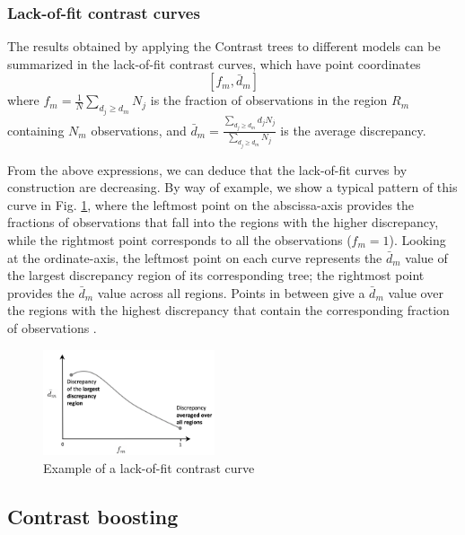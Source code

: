 \documentclass[fleqn,10pt]{wlscirep}
\begin{document}
\subsubsection*{Lack-of-fit contrast curves}

The results obtained by applying the Contrast trees to different models can be summarized in the lack-of-fit contrast curves, which have point coordinates 
$$[f_m,\bar{d}_m]$$
where $f_m=\frac{1}{N}\sum_{d_j\geq d_m}N_j$ is the fraction of observations in the region $R_m$ containing $N_m$ observations, and $\bar{d}_m=\frac{\sum_{d_j\geq d_m}d_j N_j}{\sum_{d_j\geq d_m}N_j}$ is the average discrepancy.

From the above expressions, we can deduce that the lack-of-fit curves by construction are decreasing. By way of example, we show a typical pattern of this curve in Fig. \ref{fig:lof-ex}, where the leftmost point on the abscissa-axis provides the fractions of observations that fall into the regions with the higher discrepancy, while the rightmost point corresponds to all the observations ($f_m=1$).
Looking at the ordinate-axis, the leftmost point on each curve represents the $\bar{d}_m$ value of the largest discrepancy region of its corresponding tree; the rightmost point provides the $\bar{d}_m$ value across all regions. Points in between give a $\bar{d}_m$ value over the regions with the highest discrepancy that contain the corresponding fraction of observations \cite{Friedman2020}.
\begin{figure}[ht]
\centering
\includegraphics[width=0.45\textwidth]{lof_example.png}
\caption{Example of a lack-of-fit contrast curve}
\label{fig:lof-ex}
\end{figure}

\subsection*{Contrast boosting}
\end{document}

